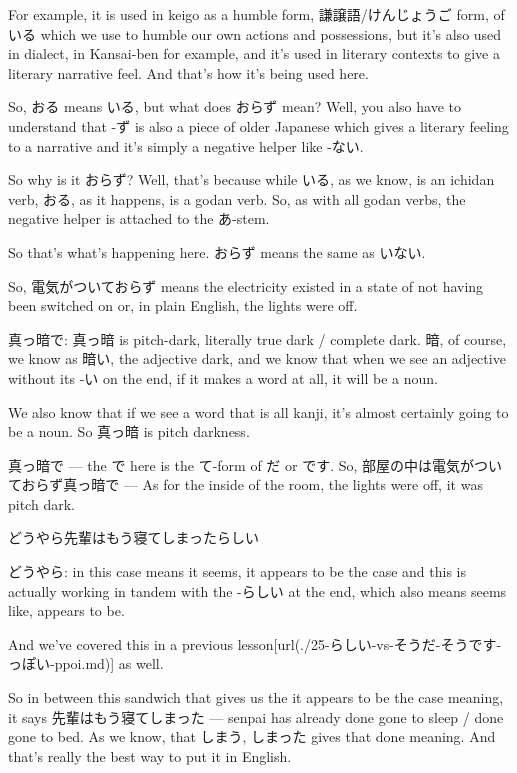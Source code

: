 For example, it is used in keigo as a humble form, 謙譲語/けんじょうご form, of いる which we use to humble our own actions and possessions, but it's also used in dialect, in Kansai-ben for example, and it's used in literary contexts to give a literary narrative feel. And that's how it's being used here.

So, おる means いる, but what does おらず mean? Well, you also have to understand that -ず is also a piece of older Japanese which gives a literary feeling to a narrative and it's simply a negative helper like -ない.

{}

So why is it おらず? Well, that's because while いる, as we know, is an ichidan verb, おる, as it happens, is a godan verb. So, as with all godan verbs, the negative helper is attached to the あ-stem.

So that's what's happening here. おらず means the same as いない.

So, 電気がついておらず means the electricity existed in a state of not having been switched on or, in plain English, the lights were off.

真っ暗で: 真っ暗 is pitch-dark, literally true dark / complete dark. 暗, of course, we know as 暗い, the adjective dark, and we know that when we see an adjective without its -い on the end, if it makes a word at all, it will be a noun.

{}

We also know that if we see a word that is all kanji, it's almost certainly going to be a noun. So 真っ暗 is pitch darkness.

真っ暗で --- the で here is the て-form of だ or です. So, 部屋の中は電気がついておらず真っ暗で --- As for the inside of the room, the lights were off, it was pitch dark.

\thinrule

どうやら先輩はもう寝てしまったらしい

どうやら: in this case means it seems, it appears to be the case and this is actually working in tandem with the -らしい at the end, which also means seems like, appears to be.

{}

And we've covered this in a previous lesson\goto{{[}25{]}}[url(./25-らしい-vs-そうだ-そうです-っぽい-ppoi.md)] as well.

So in between this sandwich that gives us the it appears to be the case meaning, it says 先輩はもう寝てしまった --- senpai has already done gone to sleep / done gone to bed. As we know, that しまう, しまった gives that done meaning. And that's really the best way to put it in English.

